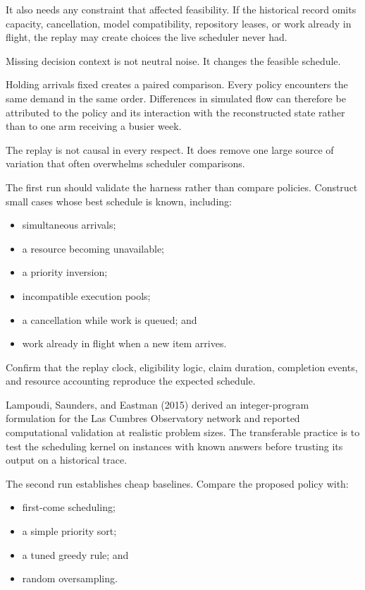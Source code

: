 It also needs any constraint that affected feasibility. If the historical record omits capacity, cancellation, model compatibility, repository leases, or work already in flight, the replay may create choices the live scheduler never had.

Missing decision context is not neutral noise. It changes the feasible schedule.

Holding arrivals fixed creates a paired comparison. Every policy encounters the same demand in the same order. Differences in simulated flow can therefore be attributed to the policy and its interaction with the reconstructed state rather than to one arm receiving a busier week.

The replay is not causal in every respect. It does remove one large source of variation that often overwhelms scheduler comparisons.

The first run should validate the harness rather than compare policies. Construct small cases whose best schedule is known, including:

\begin{itemize}
\tightlist
\item
  simultaneous arrivals;
\item
  a resource becoming unavailable;
\item
  a priority inversion;
\item
  incompatible execution pools;
\item
  a cancellation while work is queued; and
\item
  work already in flight when a new item arrives.
\end{itemize}

Confirm that the replay clock, eligibility logic, claim duration, completion events, and resource accounting reproduce the expected schedule.

Lampoudi, Saunders, and Eastman (2015) derived an integer-program formulation for the Las Cumbres Observatory network and reported computational validation at realistic problem sizes. The transferable practice is to test the scheduling kernel on instances with known answers before trusting its output on a historical trace.

The second run establishes cheap baselines. Compare the proposed policy with:

\begin{itemize}
\tightlist
\item
  first-come scheduling;
\item
  a simple priority sort;
\item
  a tuned greedy rule; and
\item
  random oversampling.
\end{itemize}

